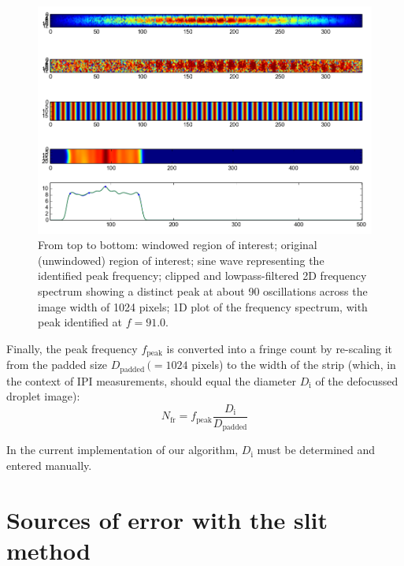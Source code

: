 \documentclass[11.5pt]{book}
\begin{document}
\begin{figure}[h]
    \centering
    \includegraphics[height=0.38\textheight]{img/globalsizing-dropletpeak.png}
    \caption{From top to bottom: windowed region of interest; original
    (unwindowed) region of interest; sine wave representing the identified peak
frequency; clipped and lowpass-filtered 2D frequency spectrum showing a distinct
peak at about 90 oscillations across the image width of 1024 pixels; 1D plot of
the frequency spectrum, with peak identified at $f=91.0$.}
    \label{fig:globalsizing-dropletpeak}
\end{figure}

Finally, the peak frequency $f_\text{peak}$ is converted into a fringe count by re-scaling it
from the padded size $D_\text{padded}\, (= 1024$ pixels) to the width of the strip (which, in the
context of IPI measurements, should equal the diameter $D_\text{i}$ of the defocussed droplet
image):
\begin{equation}
    N_\text{fr} = f_\text{peak} \frac{D_\text{i}}{D_\text{padded}}
    \label{fringes-from-diameter}
\end{equation}

In the current implementation of our algorithm, $D_\text{i}$ must be determined
and entered manually.

\section{Sources of error with the slit method}
\end{document}
